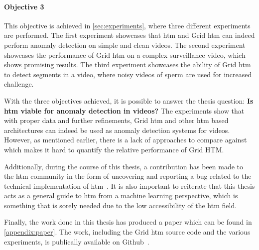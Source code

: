 \paragraph*{Objective 3} \emph{}
\par
This objective is achieved in \autoref{sec:experiments}, where three different experiments are performed. The first experiment showcases that \gls*{htm} and Grid \gls*{htm} can indeed perform anomaly detection on simple and clean videos. The second experiment showcases the performance of Grid \gls*{htm} on a complex surveillance video, which shows promising results. The third experiment showcases the ability of Grid \gls*{htm} to detect segments in a video, where noisy videos of sperm are used for increased challenge.
\par
With the three objectives achieved, it is possible to answer the thesis question: \textbf{Is \gls*{htm} viable for anomaly detection in videos?} The experiments show that with proper data and further refinements, Grid \gls*{htm} and other \gls*{htm} based architectures can indeed be used as anomaly detection systems for videos. However, as mentioned earlier, there is a lack of approaches to compare against which makes it hard to quantify the relative performance of Grid HTM.
\par
Additionally, during the course of this thesis, a contribution has been made to the  \gls*{htm} community in the form of uncovering and reporting a bug related to the technical implementation of  \gls*{htm}~\cite{github_contrib}. It is also important to reiterate that this thesis acts as a general guide to \gls*{htm} from a machine learning perspective, which is something that is sorely needed due to the low accessibility of the \gls*{htm} field.
\par
Finally, the work done in this thesis has produced a paper which can be found in \autoref{appendix:paper}. The work, including the Grid \gls*{htm} source code and the various experiments, is publically available on Github~\cite{master_thesis_github}.
